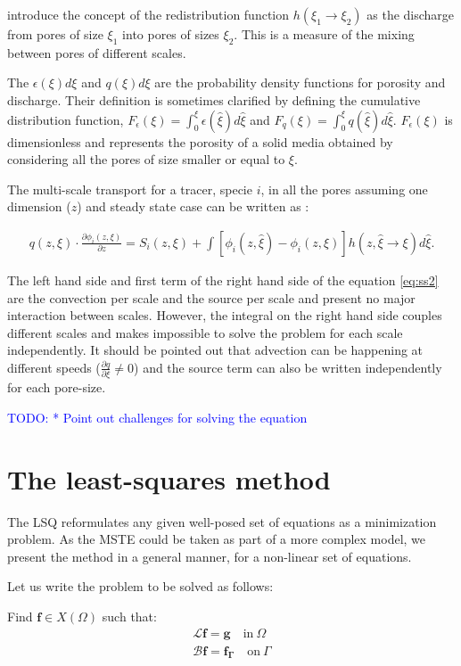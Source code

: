 \documentclass{CFD2011}
\newcommand{\TODO}[1]{\textcolor{blue}{TODO: #1} \\}
\begin{document}
\cite{DupuySchwarz} introduce the concept of the redistribution function $h(\xi_1 \rightarrow \xi_2)$ as the discharge from pores of size $\xi_1$ into pores of sizes $\xi_2$. This is a measure of the mixing between pores of different scales.

The $\epsilon(\xi)d\xi$ and $q(\xi)d\xi$ are the probability density functions for porosity and discharge. Their definition is sometimes clarified by defining the cumulative distribution function, $F_{\epsilon}(\xi)=\int_0^{\xi}\epsilon(\hat \xi)d\hat\xi$ and $F_{q}(\xi)=\int_0^{\xi}q(\hat\xi)d\hat\xi$. $F_{\epsilon}(\xi)$ is dimensionless and represents the porosity of a solid media obtained by considering all the pores of size smaller or equal to $\xi$.

The multi-scale transport for a tracer, specie $i$, in all the pores assuming one dimension ($z$) and steady state case can be written as \citep{DupuySchwarz}:

\begin{align}
q(z, \xi) \cdot \frac{\partial \phi_{i}(z, \xi)}{\partial z}  = 
 S_{i}(z, \xi) + \int [\phi_{i}(z, \hat \xi) - \phi_{i}(z, \xi)] h(z, \hat \xi \rightarrow \xi) d\hat \xi . 
\label{eq:ss2}
\end{align}

The left hand side and first term of the right hand side of the equation \ref{eq:ss2} are the convection per scale and the source per scale and present no major interaction between scales. However, the integral on the right hand side couples different scales and makes impossible to solve the problem for each scale independently. It should be pointed out that advection can be happening at different speeds ($\tfrac{\partial q}{\partial \xi} \neq 0$) and the source term can also be written independently for each pore-size.

\TODO{    * Point out challenges for solving the equation}

\section{The least-squares method}
The LSQ reformulates any given well-posed set of equations as a minimization problem. As the MSTE could be taken as part of a more complex model, we present the method in a general manner, for a non-linear set of equations. 

Let us write the problem to be solved as follows: 

Find $\mathbf{f}\in X(\Omega)$ such that:
\begin{eqnarray}
\mathcal{L} \mathbf{f} = \mathbf{g} \quad \mbox{in} \ \Omega \label{eq:Problem} \\
\mathcal{B} \mathbf{f} = \mathbf{f_\Gamma} \quad \mbox{on} \ \Gamma \label{eq:Boundary}
\end{eqnarray}
\end{document}
